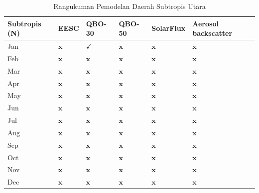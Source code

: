\begin{enumerate}
\begin{table}[p]
\begin{tabular}{|l|l|l|l|l|l|}
\hline Subtropis (N) & EESC & QBO-30 & QBO-50 & SolarFlux & Aerosol backscatter \\
\hline Jan & $\mathbf{x}$ & $\checkmark$ & $\mathbf{x}$ & $\mathbf{x}$ & $\mathbf{x}$ \\
\hline Feb & $\mathbf{x}$ & $\mathbf{x}$ & $\mathbf{x}$ & $\mathbf{x}$ & $\mathbf{x}$ \\
\hline Mar & $\mathbf{x}$ & $\mathbf{x}$ & $\mathbf{x}$ & $\mathbf{x}$ & $\mathbf{x}$ \\
\hline Apr & $\mathbf{x}$ & $\mathbf{x}$ & $\mathbf{x}$ & $\mathbf{x}$ & $\mathbf{x}$ \\
\hline May & $\mathbf{x}$ & $\mathbf{x}$ & $\mathbf{x}$ & $\mathbf{x}$ & $\mathbf{x}$ \\
\hline Jun & $\mathbf{x}$ & $\mathbf{x}$ & $\mathbf{x}$ & $\mathbf{x}$ & $\mathbf{x}$ \\
\hline Jul & $\mathbf{x}$ & $\mathbf{x}$ & $\mathbf{x}$ & $\mathbf{x}$ & $\mathbf{x}$ \\
\hline Aug & $\mathbf{x}$ & $\mathbf{x}$ & $\mathbf{x}$ & $\mathbf{x}$ & $\mathbf{x}$ \\
\hline Sep & $\mathbf{x}$ & $\mathbf{x}$ & $\mathbf{x}$ & $\mathbf{x}$ & $\mathbf{x}$ \\
\hline Oct & $\mathbf{x}$ & $\mathbf{x}$ & $\mathbf{x}$ & $\mathbf{x}$ & $\mathbf{x}$ \\
\hline Nov & $\mathbf{x}$ & $\mathbf{x}$ & $\mathbf{x}$ & $\mathbf{x}$ & $\mathbf{x}$ \\
\hline Dec & $\mathbf{x}$ & $\mathbf{x}$ & $\mathbf{x}$ & $\mathbf{x}$ & $\mathbf{x}$ \\
\hline
\end{tabular}

    \caption{Rangukuman Pemodelan Daerah Subtropis Utara}
    \label{tab:subtropisN}
\end{table}


\end{enumerate}
